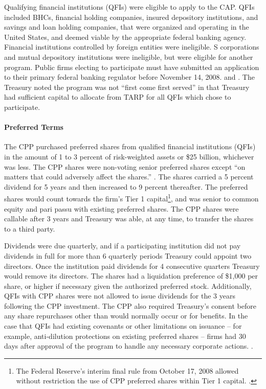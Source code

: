\documentclass[12pt]{article}
\begin{document}
Qualifying financial institutions (QFIs) were eligible to apply to the CAP. QFIs included BHCs, financial holding companies, insured depository institutions, and savings and loan holding companies, that were organized and operating in the United States, and deemed viable by the appropriate federal banking agency. Financial institutions controlled by foreign entities were ineligible. S corporations and mutual depository institutions were ineligible, but were eligible for another program. Public firms electing to participate must have submitted an application to their primary federal banking regulator before November 14, 2008. \citep{mofo} and \citep{CPPTerms}. The Treasury noted the program was not ``first come first served'' in that Treasury had sufficient capital to allocate from TARP for all QFIs which chose to participate. 

\paragraph{Preferred Terms}

The CPP purchased preferred shares from qualified financial institutions (QFIs) in the amount of 1 to 3 percent of risk-weighted assets or \$25 billion, whichever was less. The CPP shares were non-voting senior preferred shares except ``on matters that could adversely affect the shares.'' \citep{CPPAnnouncement}. The shares carried a 5 percent dividend for 5 years and then increased to 9 percent thereafter. The preferred shares would count towards the firm's Tier 1 capital\footnote{The Federal Reserve's interim final rule from October 17, 2008 allowed without restriction the use of CPP preferred shares within Tier 1 capital. \citep{FedTier1}.}, and was senior to common equity and pari passu with existing preferred shares. The CPP shares were callable after 3 years and Treasury was able, at any time, to transfer the shares to a third party. 

Dividends were due quarterly, and if a participating institution did not pay dividends in full for more than 6 quarterly periods Treasury could appoint two directors. Once the institution paid dividends for 4 consecutive quarters Treasury would remove its directors. The shares had a liquidation preference of \$1,000 per share, or higher if necessary given the authorized preferred stock. Additionally, QFIs with CPP shares were not allowed to issue dividends for the 3 years following the CPP investment. The CPP also required Treasury's consent before any share repurchases other than would normally occur or for benefits. In the case that QFIs had existing covenants or other limitations on issuance -- for example, anti-dilution protections on existing preferred shares -- firms had 30 days after approval of the program to handle any necessary corporate actions. \citep{mofo2}.
\end{document}
